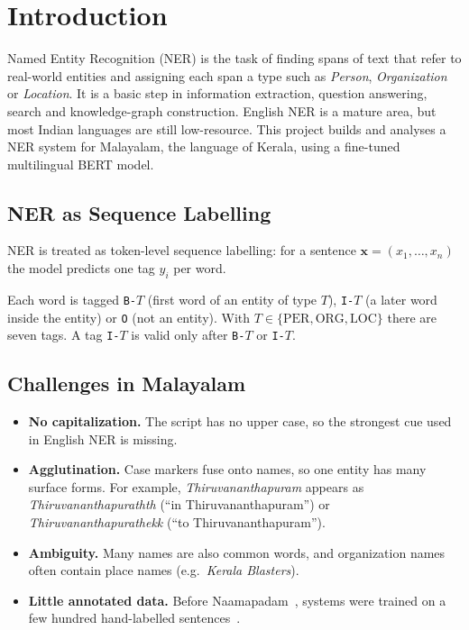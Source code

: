 \chapter{Introduction}

Named Entity Recognition (NER) is the task of finding spans of text that
refer to real-world entities and assigning each span a type such as
\emph{Person}, \emph{Organization} or \emph{Location}. It is a basic step
in information extraction, question answering, search and knowledge-graph
construction. English NER is a mature area, but most Indian languages are
still low-resource. This project builds and analyses a NER system for
Malayalam, the language of Kerala, using a fine-tuned multilingual BERT
model.

\section{NER as Sequence Labelling}

NER is treated as token-level sequence labelling: for a sentence
$\mathbf{x} = (x_1, \ldots, x_n)$ the model predicts one tag $y_i$ per word.

\begin{definition}\label{def:iob2}
Each word is tagged \texttt{B-}$T$ (first word of an entity of type $T$),
\texttt{I-}$T$ (a later word inside the entity) or \texttt{O} (not an
entity). With $T \in \{\mathrm{PER}, \mathrm{ORG},
\mathrm{LOC}\}$ there are seven tags. A tag \texttt{I-}$T$ is valid only
after \texttt{B-}$T$ or \texttt{I-}$T$.
\end{definition}

\section{Challenges in Malayalam}

\begin{itemize}
  \item \textbf{No capitalization.} The script has no upper case, so the
  strongest cue used in English NER is missing.
  \item \textbf{Agglutination.} Case markers fuse onto names, so one entity
  has many surface forms. For example, \emph{Thiruvananthapuram} appears as
  \emph{Thiruvananthapurathth} (``in Thiruvananthapuram'') or
  \emph{Thiruvananthapurathekk} (``to Thiruvananthapuram'').
  \item \textbf{Ambiguity.} Many names are also common words, and
  organization names often contain place names (e.g.\ \emph{Kerala
  Blasters}).
  \item \textbf{Little annotated data.} Before Naamapadam~\cite{mhaske2023naamapadam},
  systems were trained on a few hundred hand-labelled
  sentences~\cite{lakshmi2016fuzzy}.
\end{itemize}

